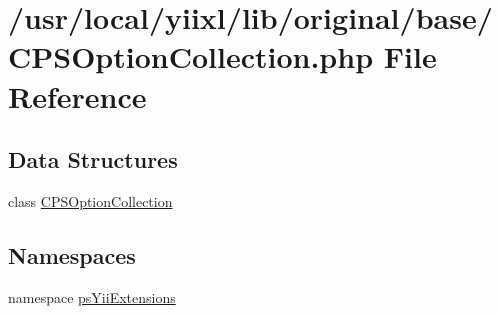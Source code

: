\hypertarget{CPSOptionCollection_8php}{
\section{/usr/local/yiixl/lib/original/base/CPSOptionCollection.php File Reference}
\label{CPSOptionCollection_8php}
}
\subsection*{Data Structures}
\begin{DoxyCompactItemize}
\item 
class \hyperlink{classCPSOptionCollection}{CPSOptionCollection}
\end{DoxyCompactItemize}
\subsection*{Namespaces}
\begin{DoxyCompactItemize}
\item 
namespace \hyperlink{namespacepsYiiExtensions}{psYiiExtensions}
\end{DoxyCompactItemize}
